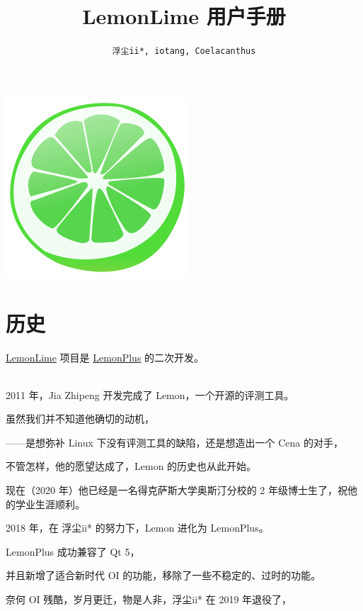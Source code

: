 \documentclass[UTF-8]{ctexart}
\title{\textbf{\huge LemonLime 用户手册}}
\author{\texttt{浮尘ii*, iotang, Coelacanthus}}
\begin{document}
	\maketitle
	
	\begin{center}
	\includegraphics[scale=0.5]{pics/icon.png}
	\end{center}
	\newpage
	
	\tableofcontents
	
	\newpage	
	
	\section{历史}
	
		\href{https://github.com/Project-LemonLime/Project_LemonLime}{LemonLime} 项目是 \href{https://github.com/Dust1404/Project_LemonPlus}{LemonPlus} 的二次开发。
	
		~\\
	
		2011 年，Jia Zhipeng 开发完成了 Lemon，一个开源的评测工具。
		
		虽然我们并不知道他确切的动机，
		
		——是想弥补 Linux 下没有评测工具的缺陷，还是想造出一个 Cena 的对手，
		
		不管怎样，他的愿望达成了，Lemon 的历史也从此开始。
		
		现在（2020 年）他已经是一名得克萨斯大学奥斯汀分校的 2 年级博士生了，祝他的学业生涯顺利。\newline
		
		2018 年，在 浮尘ii* 的努力下，Lemon 进化为 LemonPlus。
		
		LemonPlus 成功兼容了 Qt 5，
		
		并且新增了适合新时代 OI 的功能，移除了一些不稳定的、过时的功能。
		
		奈何 OI 残酷，岁月更迁，物是人非，浮尘ii* 在 2019 年退役了，
		
\end{document}
